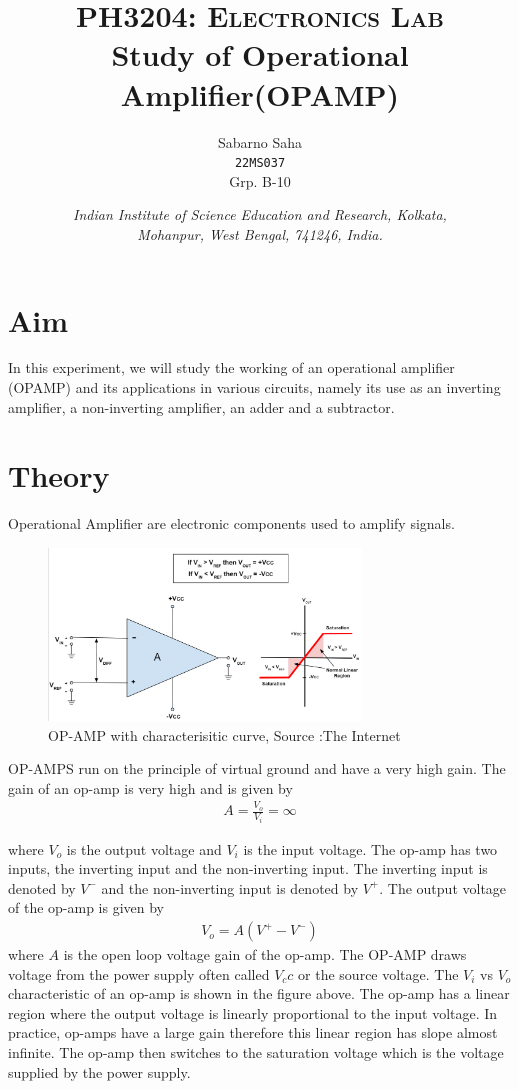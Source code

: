 \documentclass{scrartcl}
\title{
        \Large\textsc{PH3204: Electronics Lab} \\
        \vspace{10pt}
        \Huge \textbf{Study of Operational Amplifier(OPAMP)} \\
}
\author{Sabarno Saha \\ \texttt{22MS037} \\ Grp. B-10}
\date{\normalsize
        \textit{Indian Institute of Science Education and Research, Kolkata, \\
        Mohanpur, West Bengal, 741246, India.}
}
\newcommand{\1}{\mathbbm{1}}
\begin{document}
\maketitle
\tableofcontents
\newpage
\section{Aim}
In this experiment, we will study the working of an operational amplifier (OPAMP) and its applications in various circuits, namely
its use as an inverting amplifier, a non-inverting amplifier, an adder and a subtractor.
\section{Theory}
Operational Amplifier are electronic components used to amplify signals. 
\begin{figure}[h]
    \centering
    \includegraphics[width=0.74\textwidth]{opamp.png}
    \caption{OP-AMP with characterisitic curve, Source :The Internet}
\end{figure}
OP-AMPS run on the principle of virtual ground and have a very high gain. The gain of an op-amp is very high and is given by
\begin{align*}
    A = \frac{V_o}{V_i} = \infty
\end{align*}

where $V_o$ is the output voltage and $V_i$ is the input voltage. The op-amp has two inputs, the inverting input and the non-inverting input. 
The inverting input is denoted by $V^-$ and the non-inverting input is denoted by $V^+$. 
 The output voltage of the op-amp is given by
\begin{align*}
    V_o = A(V^+ - V^-)
\end{align*}
where $A$ is the open loop voltage gain of the op-amp.
The OP-AMP draws voltage from the power supply often called $V_cc$ or the source voltage. The $V_i$ vs $V_o$ 
characteristic of an op-amp is shown in the figure above. The op-amp has a linear region where the output voltage is linearly proportional to the input voltage.
In practice, op-amps have a large gain therefore this linear region has slope almost infinite.
The op-amp then switches to the saturation voltage which is the voltage supplied by the power supply.
\end{document}
